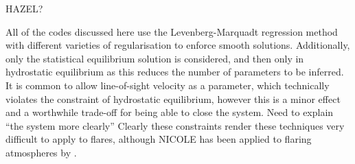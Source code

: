 {\color{Red} HAZEL?}

All of the codes discussed here use the Levenberg-Marquadt regression method with different varieties of regularisation to enforce smooth solutions.
Additionally, only the statistical equilibrium solution is considered, and then only in hydrostatic equilibrium as this reduces the number of parameters to be inferred.
It is common to allow line-of-sight velocity as a parameter, which technically violates the constraint of hydrostatic equilibrium, however this is a minor effect and a worthwhile trade-off for being able to close the system.
{\color{Red} Need to explain ``the system more clearly''}
Clearly these constraints render these techniques very difficult to apply to flares, although NICOLE has been applied to flaring atmospheres by \citet{Kuridze2018}.